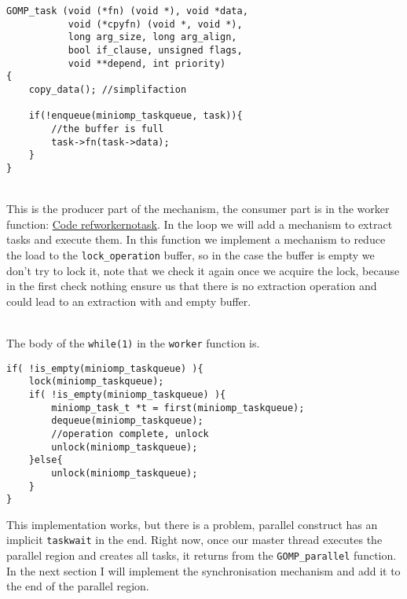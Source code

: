 \begin{lstlisting}[caption=\texttt{GOMP\_task} implementation, label=producer]
GOMP_task (void (*fn) (void *), void *data,
           void (*cpyfn) (void *, void *),
           long arg_size, long arg_align,
           bool if_clause, unsigned flags,
           void **depend, int priority)
{
    copy_data(); //simplifaction
    
    if(!enqueue(miniomp_taskqueue, task)){
        //the buffer is full
        task->fn(task->data);
    }
}
\end{lstlisting}
\par ~\\
This is the producer part of the mechanism, the consumer part is in the worker function: \hyperref[workernotask]{Code \*ref{workernotask}}. In the loop we will add a mechanism to extract tasks and execute them.
In this function we implement a mechanism to reduce the load to the \texttt{lock\_operation} buffer, so in the case the buffer is empty we don't try to lock it, note that we check it again once we acquire the lock, because in the first check nothing ensure us that there is no extraction operation and could lead to an extraction with and empty buffer.

\par ~\\
The body of the \texttt{while(1)} in the \texttt{worker} function is.

\begin{lstlisting}[caption=Body of the consumer, label=consumer]
if( !is_empty(miniomp_taskqueue) ){
    lock(miniomp_taskqueue);
    if( !is_empty(miniomp_taskqueue) ){
        miniomp_task_t *t = first(miniomp_taskqueue);
        dequeue(miniomp_taskqueue);
        //operation complete, unlock
        unlock(miniomp_taskqueue);
    }else{
        unlock(miniomp_taskqueue);
    }
}
\end{lstlisting}

This implementation works, but there is a problem, parallel construct has an implicit \texttt{taskwait} in the end. Right now, once our master thread executes the parallel region and creates all tasks, it returns from the \texttt{GOMP\_parallel} function. In the next section I will implement the synchronisation mechanism and add it to the end of the parallel region.
